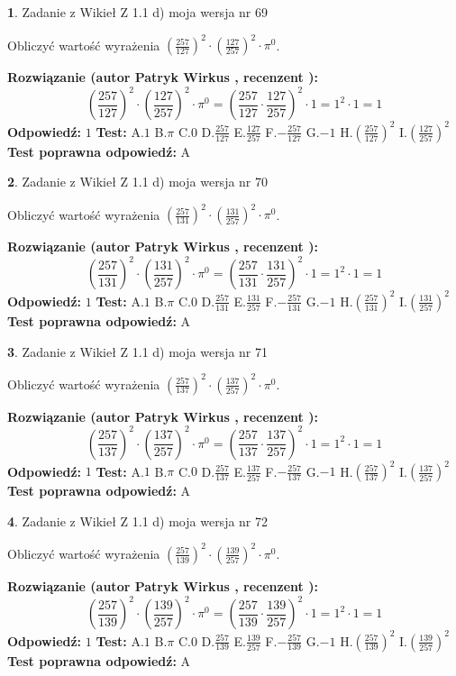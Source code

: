 \documentclass[12pt, a4paper]{article}
\theoremstyle{definition} %
\newtheorem{zad}{}
\newcommand{\zadStart}[1]{\begin{zad}#1\newline}
\newcommand{\zadStop}{\end{zad}}
\newcommand{\rozwStart}[2]{\noindent \textbf{Rozwiązanie (autor #1 , recenzent #2): }\newline}
\newcommand{\rozwStop}{\newline}
\newcommand{\odpStart}{\noindent \textbf{Odpowiedź:}\newline}
\newcommand{\odpStop}{\newline}
\newcommand{\testStart}{\noindent \textbf{Test:}\newline}
\newcommand{\testStop}{\newline}
\newcommand{\kluczStart}{\noindent \textbf{Test poprawna odpowiedź:}\newline}
\newcommand{\kluczStop}{\newline}
\begin{document}
\zadStart{Zadanie z Wikieł Z 1.1 d) moja wersja nr 69}

Obliczyć wartość wyrażenia $(\frac{257}{127})^{2} \cdot (\frac{127}{257})^{2} \cdot \pi^{0}$.
\zadStop
\rozwStart{Patryk Wirkus}{}
$$(\frac{257}{127})^{2} \cdot (\frac{127}{257})^{2} \cdot \pi^{0} = (\frac{257}{127} \cdot \frac{127}{257})^{2} \cdot 1 = 1^{2} \cdot 1 = 1$$
\rozwStop
\odpStart
$1$
\odpStop
\testStart
A.$1$ B.$\pi$ C.$0$ D.$\frac{257}{127}$ E.$\frac{127}{257}$
F.$-\frac{257}{127}$ G.$-1$
H.$(\frac{257}{127})^{2}$
I.$(\frac{127}{257})^{2}$
\testStop
\kluczStart
A
\kluczStop



\zadStart{Zadanie z Wikieł Z 1.1 d) moja wersja nr 70}

Obliczyć wartość wyrażenia $(\frac{257}{131})^{2} \cdot (\frac{131}{257})^{2} \cdot \pi^{0}$.
\zadStop
\rozwStart{Patryk Wirkus}{}
$$(\frac{257}{131})^{2} \cdot (\frac{131}{257})^{2} \cdot \pi^{0} = (\frac{257}{131} \cdot \frac{131}{257})^{2} \cdot 1 = 1^{2} \cdot 1 = 1$$
\rozwStop
\odpStart
$1$
\odpStop
\testStart
A.$1$ B.$\pi$ C.$0$ D.$\frac{257}{131}$ E.$\frac{131}{257}$
F.$-\frac{257}{131}$ G.$-1$
H.$(\frac{257}{131})^{2}$
I.$(\frac{131}{257})^{2}$
\testStop
\kluczStart
A
\kluczStop



\zadStart{Zadanie z Wikieł Z 1.1 d) moja wersja nr 71}

Obliczyć wartość wyrażenia $(\frac{257}{137})^{2} \cdot (\frac{137}{257})^{2} \cdot \pi^{0}$.
\zadStop
\rozwStart{Patryk Wirkus}{}
$$(\frac{257}{137})^{2} \cdot (\frac{137}{257})^{2} \cdot \pi^{0} = (\frac{257}{137} \cdot \frac{137}{257})^{2} \cdot 1 = 1^{2} \cdot 1 = 1$$
\rozwStop
\odpStart
$1$
\odpStop
\testStart
A.$1$ B.$\pi$ C.$0$ D.$\frac{257}{137}$ E.$\frac{137}{257}$
F.$-\frac{257}{137}$ G.$-1$
H.$(\frac{257}{137})^{2}$
I.$(\frac{137}{257})^{2}$
\testStop
\kluczStart
A
\kluczStop



\zadStart{Zadanie z Wikieł Z 1.1 d) moja wersja nr 72}

Obliczyć wartość wyrażenia $(\frac{257}{139})^{2} \cdot (\frac{139}{257})^{2} \cdot \pi^{0}$.
\zadStop
\rozwStart{Patryk Wirkus}{}
$$(\frac{257}{139})^{2} \cdot (\frac{139}{257})^{2} \cdot \pi^{0} = (\frac{257}{139} \cdot \frac{139}{257})^{2} \cdot 1 = 1^{2} \cdot 1 = 1$$
\rozwStop
\odpStart
$1$
\odpStop
\testStart
A.$1$ B.$\pi$ C.$0$ D.$\frac{257}{139}$ E.$\frac{139}{257}$
F.$-\frac{257}{139}$ G.$-1$
H.$(\frac{257}{139})^{2}$
I.$(\frac{139}{257})^{2}$
\testStop
\kluczStart
A
\kluczStop
\end{document}
